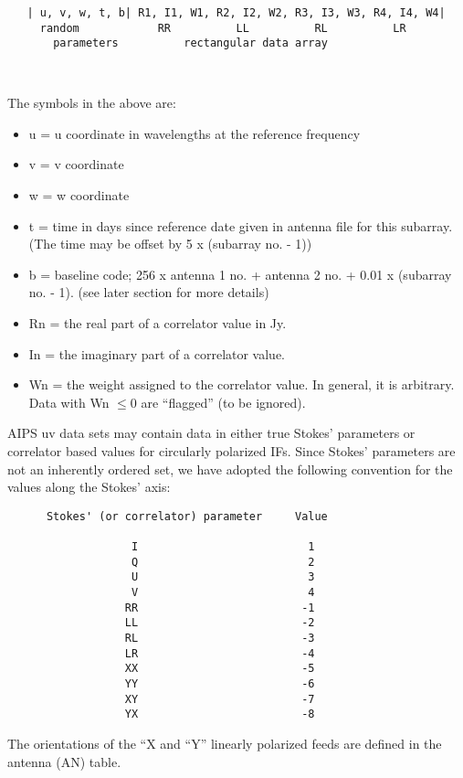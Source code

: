 \begin{verbatim}
   | u, v, w, t, b| R1, I1, W1, R2, I2, W2, R3, I3, W3, R4, I4, W4|
     random            RR          LL          RL          LR
       parameters          rectangular data array



\end{verbatim}
     The symbols in the above are:
\begin{itemize} %
\item u = u coordinate in wavelengths at the reference frequency
\item v = v coordinate
\item w = w coordinate
\item t = time in days since reference date given in antenna file for this
subarray.  (The time may be  offset by 5 x (subarray no. - 1))
\item b = baseline code; 256 x antenna 1 no. + antenna 2 no. + 0.01 x
(subarray no. - 1). (see later section for more details)
\item Rn = the real part of a correlator value in Jy.
\item In = the imaginary part of a correlator value.
\item Wn = the weight assigned to the correlator value.  In general, it is
arbitrary.  Data with  Wn $ \leq 0$ are ``flagged'' (to be ignored).

\end{itemize} %
AIPS uv data sets may contain data in either true Stokes' parameters
or correlator based values for circularly polarized IFs. Since Stokes'
parameters are not an inherently ordered set, we have adopted the
following convention for the values along the Stokes' axis:

\begin{verbatim}
      Stokes' (or correlator) parameter     Value

                   I                          1
                   Q                          2
                   U                          3
                   V                          4
                  RR                         -1
                  LL                         -2
                  RL                         -3
                  LR                         -4
                  XX                         -5
                  YY                         -6
                  XY                         -7
                  YX                         -8

\end{verbatim}
The orientations of the ``X and ``Y'' linearly polarized feeds are
defined in the antenna (AN) table.

